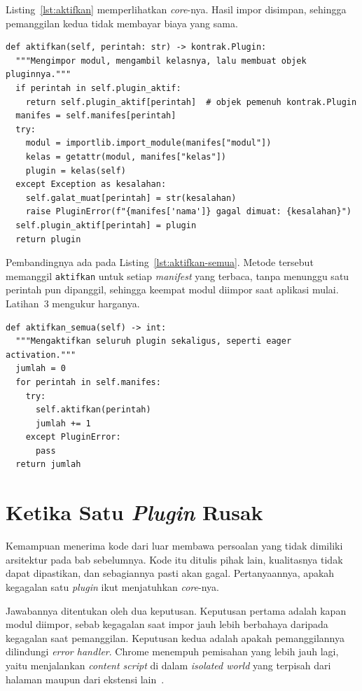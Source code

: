 Listing~\ref{lst:aktifkan} memperlihatkan \textit{core}-nya. Hasil impor disimpan,
sehingga pemanggilan kedua tidak membayar biaya yang sama.

\begin{lstlisting}[style=PythonStyle, caption={Aktivasi satu \textit{plugin},
  tersedia di \berkas{sources/chapter05/inti.py}}, label=lst:aktifkan]
def aktifkan(self, perintah: str) -> kontrak.Plugin:
  """Mengimpor modul, mengambil kelasnya, lalu membuat objek pluginnya."""
  if perintah in self.plugin_aktif:
    return self.plugin_aktif[perintah]  # objek pemenuh kontrak.Plugin
  manifes = self.manifes[perintah]
  try:
    modul = importlib.import_module(manifes["modul"])
    kelas = getattr(modul, manifes["kelas"])
    plugin = kelas(self)
  except Exception as kesalahan:
    self.galat_muat[perintah] = str(kesalahan)
    raise PluginError(f"{manifes['nama']} gagal dimuat: {kesalahan}")
  self.plugin_aktif[perintah] = plugin
  return plugin
\end{lstlisting}

Pembandingnya ada pada Listing~\ref{lst:aktifkan-semua}. Metode tersebut
memanggil \texttt{aktifkan} untuk setiap \textit{manifest} yang terbaca, tanpa
menunggu satu perintah pun dipanggil, sehingga keempat modul diimpor saat
aplikasi mulai. Latihan~3 mengukur harganya.

\begin{lstlisting}[style=PythonStyle, caption={Aktivasi seluruh \textit{plugin}
  sekaligus, tersedia di \berkas{sources/chapter05/inti.py}},
  label=lst:aktifkan-semua]
def aktifkan_semua(self) -> int:
  """Mengaktifkan seluruh plugin sekaligus, seperti eager activation."""
  jumlah = 0
  for perintah in self.manifes:
    try:
      self.aktifkan(perintah)
      jumlah += 1
    except PluginError:
      pass
  return jumlah
\end{lstlisting}

\section{Ketika Satu \textit{Plugin} Rusak}

Kemampuan menerima kode dari luar membawa persoalan yang tidak dimiliki
arsitektur pada bab sebelumnya. Kode itu ditulis pihak lain, kualitasnya tidak
dapat dipastikan, dan sebagiannya pasti akan gagal. Pertanyaannya, apakah
kegagalan satu \textit{plugin} ikut menjatuhkan \textit{core}-nya.

Jawabannya ditentukan oleh dua keputusan. Keputusan pertama adalah kapan modul
diimpor, sebab kegagalan saat impor jauh lebih berbahaya daripada kegagalan saat
pemanggilan. Keputusan kedua adalah apakah pemanggilannya dilindungi
\textit{error handler}. Chrome menempuh pemisahan yang lebih jauh lagi, yaitu menjalankan
\textit{content script} di dalam \textit{isolated world} yang terpisah dari
halaman maupun dari ekstensi lain~\cite{chrome2026content}.

